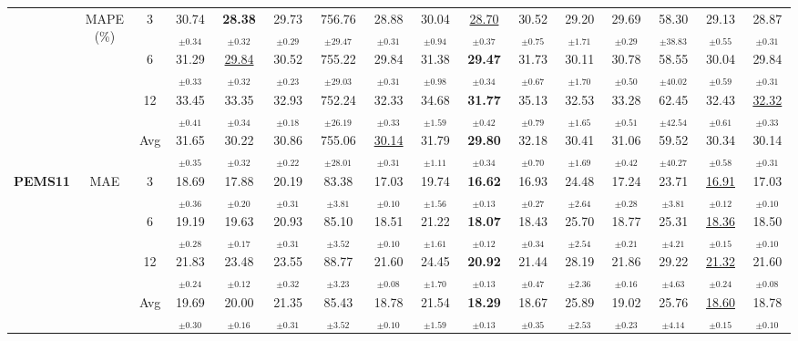\begin{table}[t]
{\begin{tabular}{ccc|ccc|cccc|cccc|cc}
\cmidrule(lr){2-16}
 & \multirow{4}{*}{MAPE (\%)} & 3 & 30.74$_{\pm0.34}$ & \textbf{28.38$_{\pm0.32}$} & 29.73$_{\pm0.29}$ & 756.76$_{\pm29.47}$ & 28.88$_{\pm0.31}$ & 30.04$_{\pm0.94}$ & \underline{28.70$_{\pm0.37}$} & 30.52$_{\pm0.75}$ & 29.20$_{\pm1.71}$ & 29.69$_{\pm0.29}$ & 58.30$_{\pm38.83}$ & 29.13$_{\pm0.55}$ & 28.87$_{\pm0.31}$ \\
 &  & 6 & 31.29$_{\pm0.33}$ & \underline{29.84$_{\pm0.32}$} & 30.52$_{\pm0.23}$ & 755.22$_{\pm29.03}$ & 29.84$_{\pm0.31}$ & 31.38$_{\pm0.98}$ & \textbf{29.47$_{\pm0.34}$} & 31.73$_{\pm0.67}$ & 30.11$_{\pm1.70}$ & 30.78$_{\pm0.50}$ & 58.55$_{\pm40.02}$ & 30.04$_{\pm0.59}$ & 29.84$_{\pm0.31}$ \\
 &  & 12 & 33.45$_{\pm0.41}$ & 33.35$_{\pm0.34}$ & 32.93$_{\pm0.18}$ & 752.24$_{\pm26.19}$ & 32.33$_{\pm0.33}$ & 34.68$_{\pm1.59}$ & \textbf{31.77$_{\pm0.42}$} & 35.13$_{\pm0.79}$ & 32.53$_{\pm1.65}$ & 33.28$_{\pm0.51}$ & 62.45$_{\pm42.54}$ & 32.43$_{\pm0.61}$ & \underline{32.32$_{\pm0.33}$} \\
 &  & Avg & 31.65$_{\pm0.35}$ & 30.22$_{\pm0.32}$ & 30.86$_{\pm0.22}$ & 755.06$_{\pm28.01}$ & \underline{30.14$_{\pm0.31}$} & 31.79$_{\pm1.11}$ & \textbf{29.80$_{\pm0.34}$} & 32.18$_{\pm0.70}$ & 30.41$_{\pm1.69}$ & 31.06$_{\pm0.42}$ & 59.52$_{\pm40.27}$ & 30.34$_{\pm0.58}$ & 30.14$_{\pm0.31}$ \\
\midrule
\multirow{12}{*}{\textbf{PEMS11}} & \multirow{4}{*}{MAE} & 3 & 18.69$_{\pm0.36}$ & 17.88$_{\pm0.20}$ & 20.19$_{\pm0.31}$ & 83.38$_{\pm3.81}$ & 17.03$_{\pm0.10}$ & 19.74$_{\pm1.56}$ & \textbf{16.62$_{\pm0.13}$} & 16.93$_{\pm0.27}$ & 24.48$_{\pm2.64}$ & 17.24$_{\pm0.28}$ & 23.71$_{\pm3.81}$ & \underline{16.91$_{\pm0.12}$} & 17.03$_{\pm0.10}$ \\
 &  & 6 & 19.19$_{\pm0.28}$ & 19.63$_{\pm0.17}$ & 20.93$_{\pm0.31}$ & 85.10$_{\pm3.52}$ & 18.51$_{\pm0.10}$ & 21.22$_{\pm1.61}$ & \textbf{18.07$_{\pm0.12}$} & 18.43$_{\pm0.34}$ & 25.70$_{\pm2.54}$ & 18.77$_{\pm0.21}$ & 25.31$_{\pm4.21}$ & \underline{18.36$_{\pm0.15}$} & 18.50$_{\pm0.10}$ \\
 &  & 12 & 21.83$_{\pm0.24}$ & 23.48$_{\pm0.12}$ & 23.55$_{\pm0.32}$ & 88.77$_{\pm3.23}$ & 21.60$_{\pm0.08}$ & 24.45$_{\pm1.70}$ & \textbf{20.92$_{\pm0.13}$} & 21.44$_{\pm0.47}$ & 28.19$_{\pm2.36}$ & 21.86$_{\pm0.16}$ & 29.22$_{\pm4.63}$ & \underline{21.32$_{\pm0.24}$} & 21.60$_{\pm0.08}$ \\
 &  & Avg & 19.69$_{\pm0.30}$ & 20.00$_{\pm0.16}$ & 21.35$_{\pm0.31}$ & 85.43$_{\pm3.52}$ & 18.78$_{\pm0.10}$ & 21.54$_{\pm1.59}$ & \textbf{18.29$_{\pm0.13}$} & 18.67$_{\pm0.35}$ & 25.89$_{\pm2.53}$ & 19.02$_{\pm0.23}$ & 25.76$_{\pm4.14}$ & \underline{18.60$_{\pm0.15}$} & 18.78$_{\pm0.10}$ \\

\end{tabular}}
\end{table}
